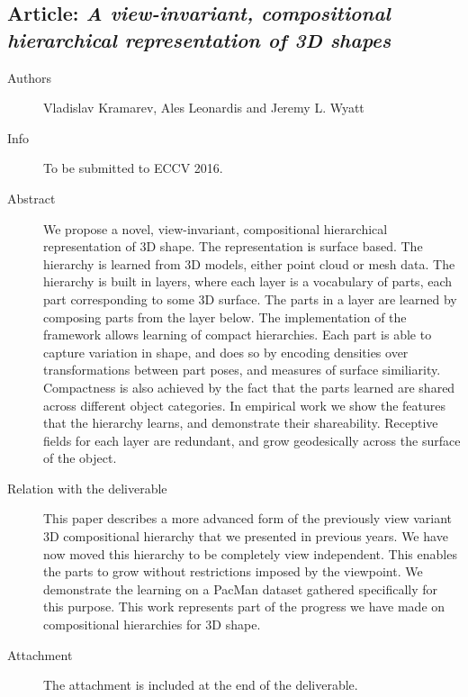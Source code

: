 \documentclass[a4paper,11pt,pdf]{../templates/pacmanreport}
\begin{document}
\subsection{Article: \em A view-invariant, compositional hierarchical representation of 3D shapes}
\begin{description}
    \item[Authors] Vladislav Kramarev, Ales Leonardis and Jeremy L. Wyatt
    \item[Info] To be submitted to ECCV 2016.
    \item[Abstract] We propose a novel, view-invariant, compositional hierarchical representation of 3D shape. The representation is surface based. The hierarchy is learned from 3D models, either point cloud or mesh data. The hierarchy is built in layers, where each layer is a vocabulary of parts, each part corresponding to some 3D surface. The parts in a layer are learned by composing parts from the layer below. The implementation of the framework allows learning of compact hierarchies. Each part is able to capture variation in shape, and does so by encoding densities over transformations between part poses, and measures of surface similiarity. Compactness is also achieved by the fact that the parts learned are shared across different object categories. In empirical work we show the features that the hierarchy learns, and demonstrate their shareability. Receptive fields for each layer are redundant, and grow geodesically across the surface of the object.
    \item [Relation with the deliverable] This paper describes a more advanced form of the previously view variant 3D compositional hierarchy that we presented in previous years. We have now moved this hierarchy to be completely view independent. This enables the parts to grow without restrictions imposed by the viewpoint. We demonstrate the learning on a PacMan dataset gathered specifically for this purpose. This work represents part of the progress we have made on compositional hierarchies for 3D shape.
    \item[Attachment] The attachment is included at the end of the deliverable. %
\end{description}
\newpage
\end{document}

